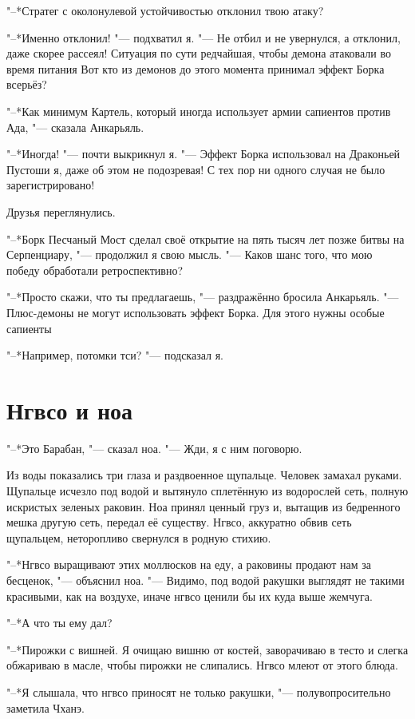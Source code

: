 "--*Стратег с околонулевой устойчивостью отклонил твою атаку?

"--*Именно отклонил! "--- подхватил я.
"--- Не отбил и не увернулся, а отклонил, даже скорее рассеял!
Ситуация по сути редчайшая, чтобы демона атаковали во время питания\ldotst
Вот кто из демонов до этого момента принимал эффект Борка всерьёз?

"--*Как минимум Картель, который иногда использует армии сапиентов против Ада, "--- сказала Анкарьяль.

"--*Иногда! "--- почти выкрикнул я.
"--- Эффект Борка использовал на Драконьей Пустоши я, даже об этом не подозревая!
С тех пор ни одного случая не было зарегистрировано!

Друзья переглянулись.

"--*Борк Песчаный Мост сделал своё открытие на пять тысяч лет позже битвы на Серпенциару, "--- продолжил я свою мысль.
"--- Каков шанс того, что мою победу обработали ретроспективно?

"--*Просто скажи, что ты предлагаешь, "--- раздражённо бросила Анкарьяль.
"--- Плюс-демоны не могут использовать эффект Борка.
Для этого нужны особые сапиенты\ldotst

"--*Например, потомки тси? "--- подсказал я.

\section{Нгвсо и ноа}

"--*Это Барабан, "--- сказал ноа.
"--- Жди, я с ним поговорю.

Из воды показались три глаза и раздвоенное щупальце.
Человек замахал руками.
Щупальце исчезло под водой и вытянуло сплетённую из водорослей сеть, полную искристых зеленых раковин.
Ноа принял ценный груз и, вытащив из бедренного мешка другую сеть, передал её существу.
Нгвсо, аккуратно обвив сеть щупальцем, неторопливо свернулся в родную стихию.

"--*Нгвсо выращивают этих моллюсков на еду, а раковины продают нам за бесценок, "--- объяснил ноа.
"--- Видимо, под водой ракушки выглядят не такими красивыми, как на воздухе, иначе нгвсо ценили бы их куда выше жемчуга.

"--*А что ты ему дал?

"--*Пирожки с вишней.
Я очищаю вишню от костей, заворачиваю в тесто и слегка обжариваю в масле, чтобы пирожки не слипались.
Нгвсо млеют от этого блюда.

"--*Я слышала, что нгвсо приносят не только ракушки, "--- полувопросительно заметила Чханэ.

